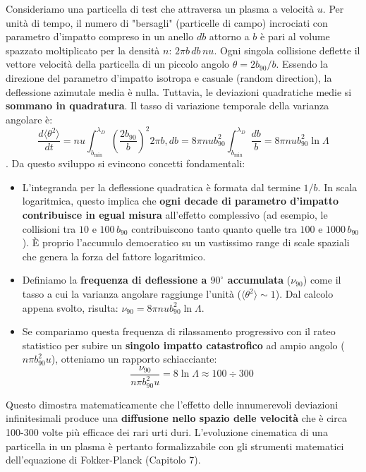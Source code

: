 Consideriamo una particella di test che attraversa un plasma a velocità $u$. Per unità di tempo, il numero di "bersagli" (particelle di campo) incrociati con parametro d'impatto compreso in un anello $db$ attorno a $b$ è pari al volume spazzato moltiplicato per la densità $n$: $2\pi b \, db \, n u$.
Ogni singola collisione deflette il vettore velocità della particella di un piccolo angolo $\theta = 2b_{90}/b$. Essendo la direzione del parametro d'impatto isotropa e casuale (random direction), la deflessione azimutale media è nulla. Tuttavia, le deviazioni quadratiche medie si \textbf{sommano in quadratura}. Il tasso di variazione temporale della varianza angolare è:
\begin{equation}
\frac{d\langle\theta^2\rangle}{dt} = n u \int_{b_{\text{min}}}^{\lambda_D} \left(\frac{2b_{90}}{b}\right)^2 2\pi b , db = 8\pi n u b_{90}^2 \int_{b_{\text{min}}}^{\lambda_D} \frac{db}{b} = 8\pi n u b_{90}^2 \ln \Lambda
\end{equation}
.
Da questo sviluppo si evincono concetti fondamentali:
\begin{itemize}
\item L'integranda per la deflessione quadratica è formata dal termine $1/b$. In scala logaritmica, questo implica che \textbf{ogni decade di parametro d'impatto contribuisce in egual misura} all'effetto complessivo (ad esempio, le collisioni tra $10$ e $100\, b_{90}$ contribuiscono tanto quanto quelle tra $100$ e $1000\, b_{90}$). È proprio l'accumulo democratico su un vastissimo range di scale spaziali che genera la forza del fattore logaritmico.
\item Definiamo la \textbf{frequenza di deflessione a $90^\circ$ accumulata} ($\nu_{90}$) come il tasso a cui la varianza angolare raggiunge l'unità ($\langle\theta^2\rangle \sim 1$). Dal calcolo appena svolto, risulta: $\nu_{90} = 8\pi n u b_{90}^2 \ln \Lambda$.
\item Se compariamo questa frequenza di rilassamento progressivo con il rateo statistico per subire un \textbf{singolo impatto catastrofico} ad ampio angolo ($n \pi b_{90}^2 u$), otteniamo un rapporto schiacciante:
\begin{equation}
\frac{\nu_{90}}{n \pi b_{90}^2 u} = 8 \ln \Lambda \approx 100 \div 300
\end{equation}
\end{itemize}
Questo dimostra matematicamente che l'effetto delle innumerevoli deviazioni infinitesimali produce una \textbf{diffusione nello spazio delle velocità} che è circa 100-300 volte più efficace dei rari urti duri. L'evoluzione cinematica di una particella in un plasma è pertanto formalizzabile con gli strumenti matematici dell'equazione di Fokker-Planck (Capitolo 7).

